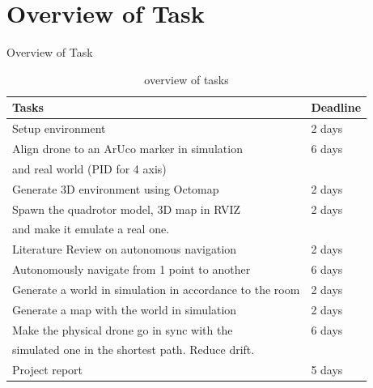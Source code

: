 \documentclass[10pt, a4paper]{beamer}
\begin{document}
\section{Overview of Task}
\begin{frame}{Overview of Task}
	\begin{table}[]
\centering
\begin{tabular}{|l|l|}
\hline
\textbf{Tasks}                                                                                          & \textbf{Deadline} \\ \hline
Setup environment                                                                             & 2 days   \\ \hline
Align drone to an ArUco marker in simulation                  & 6 days   \\ 
and real world (PID for 4 axis)                  &          \\ \hline
Generate 3D environment using Octomap                                                         & 2 days   \\ \hline
Spawn the quadrotor model, 3D map in RVIZ                     & 2 days   \\ 
and make it emulate a real one.                     &    \\ \hline
Literature Review on autonomous navigation                                                     & 2 days   \\ \hline
Autonomously navigate from 1 point to another                                                 & 6 days   \\ \hline
Generate a world in simulation in accordance to the room                                      & 2 days   \\ \hline
Generate a map with the world in simulation                                                   & 2 days   \\ \hline
Make the physical drone go in sync with the & 6 days   \\ 
simulated one in the shortest path. Reduce drift. &    \\ \hline
Project report                                                                                & 5 days   \\ \hline
\end{tabular}
\caption{overview of tasks}
\end{table}
\end{frame}
\end{document}
